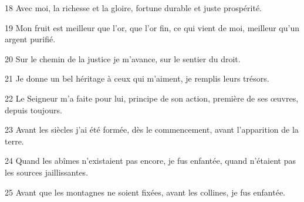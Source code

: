 18 Avec moi, la richesse et la gloire, fortune durable et juste prospérité.

19 Mon fruit est meilleur que l’or, que l’or fin, ce qui vient de moi, meilleur qu’un argent purifié.

20 Sur le chemin de la justice je m’avance, sur le sentier du droit.

21 Je donne un bel héritage à ceux qui m’aiment, je remplis leurs trésors.

22 Le Seigneur m’a faite pour lui, principe de son action, première de ses œuvres, depuis toujours.

23 Avant les siècles j’ai été formée, dès le commencement, avant l’apparition de la terre.

24 Quand les abîmes n’existaient pas encore, je fus enfantée, quand n’étaient pas les sources jaillissantes.

25 Avant que les montagnes ne soient fixées, avant les collines, je fus enfantée.